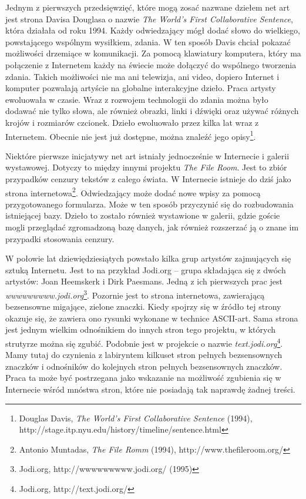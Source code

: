 \documentclass[a4paper,12pt,twoside]{article}
\begin{document}
Jednym z pierwszych przedsięwzięć,
które mogą zosać nazwane dziełem net art jest strona Davisa Douglasa
o nazwie \textit{The World's First Collaborative Sentence}, która działała
od roku 1994.
Każdy odwiedzający mógł dodać słowo do wielkiego,
powstającego wspólnym wysiłkiem, zdania. W ten sposób Davis chciał
pokazać możliwości drzemiące w komunikacji. Za pomocą klawiatury
komputera, który ma połączenie z Internetem każdy na świecie może
dołączyć do wspólnego tworzenia zdania. Takich możliwości nie ma
ani telewizja, ani video, dopiero Internet i komputer pozwalają artyście
na globalne interakcyjne dzieło. Praca artysty ewoluowała w czasie.
Wraz z rozwojem technologii do zdania można było dodawać nie tylko
słowa, ale również obrazki, linki i dźwięki oraz używać różnych krojów
i rozmiarów czcionek. Dzieło ewoluowało przez kilka lat wraz z Internetem.
Obecnie nie jest już dostępne, można znaleźć jego
opisy\footnote{Douglas Davis, \textit{The World's First Collaborative
Sentence} (1994), http://stage.itp.nyu.edu/history/timeline/sentence.html}.

Niektóre pierwsze inicjatywy net art istniały jednocześnie w Internecie
i galerii wystawowej. Dotyczy to między innymi projektu
\textit{The File Room}. Jest to zbiór przypadków cenzury tekstów z całego
świata. W Internecie istnieje do dziś jako strona
internetowa\footnote{Antonio Muntadas, \textit{The File Romm} (1994),
http://www.thefileroom.org/}. Odwiedzający
może dodać nowe wpisy za pomocą przygotowanego formularza. Może w ten sposób
przyczynić się do rozbudowania istniejącej bazy. Dzieło to zostało również
wystawione w galerii, gdzie goście mogli przeglądać zgromadzoną
bazę danych, jak również rozszerzać ją o znane im przypadki stosowania
cenzury.

W połowie lat dziewiędziesiątych powstało kilka grup artystów zajmujących
się sztuką Internetu. Jest to na przykład Jodi.org -- grupa
składająca się z dwóch artystów: Joan Heemskerk i Dirk Paesmans. Jedną
z ich pierwszych prac jest
\textit{wwwwwwwww.jodi.org}\footnote{Jodi.org, http://wwwwwwwww.jodi.org/
(1995)}. Pozornie jest to strona internetowa, zawierającą bezsensowne
migające, zielone znaczki. Kiedy spojrzy się w źródło tej strony okazuje
się, że zawiera ono rysunki wykonane w technice ASCII-art. Sama strona
jest jednym wielkim odnośnikiem do innych stron tego projektu, w których
strutyrze można się zgubić. Podobnie jest w projekcie o nazwie
\textit{text.jodi.org}\footnote{Jodi.org, http://text.jodi.org/}. Mamy tutaj
do czynienia z labiryntem kilkuset stron pełnych bezsensownych znaczków
i odnośników do kolejnych stron pełnych bezsensownych znaczków. Praca
ta może być postrzegana jako wskazanie na możliwość zgubienia się w Internecie
wśród mnóstwa stron, które nie posiadają tak naprawdę żadnej treści.
\end{document}
